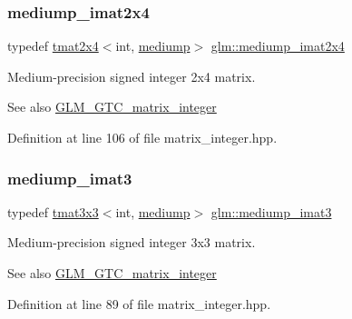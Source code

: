 \subsubsection{\texorpdfstring{mediump\_imat2x4}{mediump\_imat2x4}}
{\footnotesize\ttfamily typedef \mbox{\hyperlink{structglm_1_1tmat2x4}{tmat2x4}}$<$int, \mbox{\hyperlink{namespaceglm_a0f04f086094c747d227af4425893f545a6416f3ea0c9025fb21ed50c4d6620482}{mediump}}$>$ \mbox{\hyperlink{group__gtc__matrix__integer_ga944a139f15de6bc12e9c7bf615ffc4f5}{glm\+::mediump\+\_\+imat2x4}}}

Medium-\/precision signed integer 2x4 matrix. \begin{DoxySeeAlso}{See also}
\mbox{\hyperlink{group__gtc__matrix__integer}{G\+L\+M\+\_\+\+G\+T\+C\+\_\+matrix\+\_\+integer}} 
\end{DoxySeeAlso}


Definition at line 106 of file matrix\+\_\+integer.\+hpp.

\mbox{\label{group__gtc__matrix__integer_gab033bd6a2bfebb1aa35d458c6f077ccb}} 
\subsubsection{\texorpdfstring{mediump\_imat3}{mediump\_imat3}}
{\footnotesize\ttfamily typedef \mbox{\hyperlink{structglm_1_1tmat3x3}{tmat3x3}}$<$int, \mbox{\hyperlink{namespaceglm_a0f04f086094c747d227af4425893f545a6416f3ea0c9025fb21ed50c4d6620482}{mediump}}$>$ \mbox{\hyperlink{group__gtc__matrix__integer_gab033bd6a2bfebb1aa35d458c6f077ccb}{glm\+::mediump\+\_\+imat3}}}

Medium-\/precision signed integer 3x3 matrix. \begin{DoxySeeAlso}{See also}
\mbox{\hyperlink{group__gtc__matrix__integer}{G\+L\+M\+\_\+\+G\+T\+C\+\_\+matrix\+\_\+integer}} 
\end{DoxySeeAlso}


Definition at line 89 of file matrix\+\_\+integer.\+hpp.

\mbox{\label{group__gtc__matrix__integer_ga8f682b5b64e2072c0729409ee6bfe2af}} 

